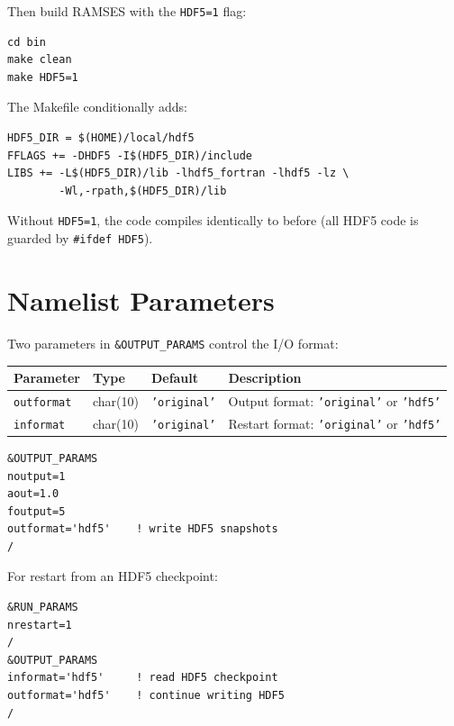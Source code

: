\documentclass[11pt,fleqn]{book}
\begin{document}
Then build RAMSES with the \texttt{HDF5=1} flag:

\begin{codebox}
\begin{lstlisting}[style=bash,numbers=none]
cd bin
make clean
make HDF5=1
\end{lstlisting}
\end{codebox}

The Makefile conditionally adds:
\begin{lstlisting}[style=fortran,numbers=none]
HDF5_DIR = $(HOME)/local/hdf5
FFLAGS += -DHDF5 -I$(HDF5_DIR)/include
LIBS += -L$(HDF5_DIR)/lib -lhdf5_fortran -lhdf5 -lz \
        -Wl,-rpath,$(HDF5_DIR)/lib
\end{lstlisting}

Without \texttt{HDF5=1}, the code compiles identically to before (all HDF5 code is guarded by \texttt{\#ifdef HDF5}).


\section{Namelist Parameters}

Two parameters in \texttt{\&OUTPUT\_PARAMS} control the I/O format:

\begin{center}
\begin{tabular}{llll}
\toprule
\textbf{Parameter} & \textbf{Type} & \textbf{Default} & \textbf{Description} \\
\midrule
\texttt{outformat} & char(10) & \texttt{'original'} & Output format: \texttt{'original'} or \texttt{'hdf5'} \\
\texttt{informat} & char(10) & \texttt{'original'} & Restart format: \texttt{'original'} or \texttt{'hdf5'} \\
\bottomrule
\end{tabular}
\end{center}

\begin{codebox}
\begin{lstlisting}[style=fortran,numbers=none]
&OUTPUT_PARAMS
noutput=1
aout=1.0
foutput=5
outformat='hdf5'    ! write HDF5 snapshots
/
\end{lstlisting}
\end{codebox}

For restart from an HDF5 checkpoint:
\begin{codebox}
\begin{lstlisting}[style=fortran,numbers=none]
&RUN_PARAMS
nrestart=1
/
&OUTPUT_PARAMS
informat='hdf5'     ! read HDF5 checkpoint
outformat='hdf5'    ! continue writing HDF5
/
\end{lstlisting}
\end{codebox}
\end{document}
